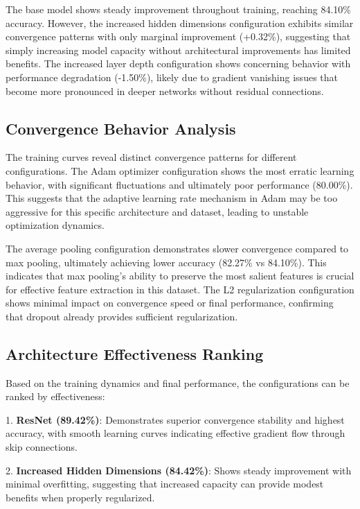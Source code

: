 \documentclass{article}
\begin{document}
The base model shows steady improvement throughout training, reaching 84.10\% accuracy. However, the increased hidden dimensions configuration exhibits similar convergence patterns with only marginal improvement (+0.32\%), suggesting that simply increasing model capacity without architectural improvements has limited benefits. The increased layer depth configuration shows concerning behavior with performance degradation (-1.50\%), likely due to gradient vanishing issues that become more pronounced in deeper networks without residual connections.

\subsection{Convergence Behavior Analysis}

The training curves reveal distinct convergence patterns for different configurations. The Adam optimizer configuration shows the most erratic learning behavior, with significant fluctuations and ultimately poor performance (80.00\%). This suggests that the adaptive learning rate mechanism in Adam may be too aggressive for this specific architecture and dataset, leading to unstable optimization dynamics.

The average pooling configuration demonstrates slower convergence compared to max pooling, ultimately achieving lower accuracy (82.27\% vs 84.10\%). This indicates that max pooling's ability to preserve the most salient features is crucial for effective feature extraction in this dataset. The L2 regularization configuration shows minimal impact on convergence speed or final performance, confirming that dropout already provides sufficient regularization.

\subsection{Architecture Effectiveness Ranking}

Based on the training dynamics and final performance, the configurations can be ranked by effectiveness:

1. \textbf{ResNet (89.42\%)}: Demonstrates superior convergence stability and highest accuracy, with smooth learning curves indicating effective gradient flow through skip connections.

2. \textbf{Increased Hidden Dimensions (84.42\%)}: Shows steady improvement with minimal overfitting, suggesting that increased capacity can provide modest benefits when properly regularized.
\end{document}
